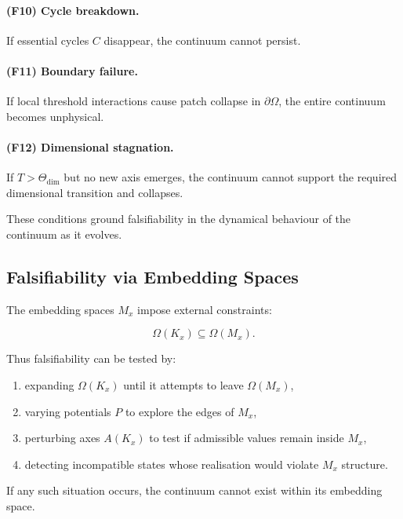\paragraph{(F10) Cycle breakdown.}  
If essential cycles $C$ disappear, the continuum cannot persist.

\paragraph{(F11) Boundary failure.}  
If local threshold interactions cause patch collapse in $\partial\Omega$,
the entire continuum becomes unphysical.

\paragraph{(F12) Dimensional stagnation.}  
If $T > \Theta_{\mathrm{dim}}$ but no new axis emerges, the continuum
cannot support the required dimensional transition and collapses.

These conditions ground falsifiability in the dynamical behaviour of
the continuum as it evolves.



\subsection{Falsifiability via Embedding Spaces}

The embedding spaces $M_x$ impose external constraints:

\[
\Omega(K_x) \subseteq \Omega(M_x).
\]

Thus falsifiability can be tested by:

\begin{enumerate}
    \item expanding $\Omega(K_x)$ until it attempts to leave 
          $\Omega(M_x)$,
    \item varying potentials $P$ to explore the edges of $M_x$,
    \item perturbing axes $A(K_x)$ to test if admissible values remain
          inside $M_x$,
    \item detecting incompatible states whose realisation would violate
          $M_x$ structure.
\end{enumerate}

If any such situation occurs, the continuum cannot exist within its
embedding space.



